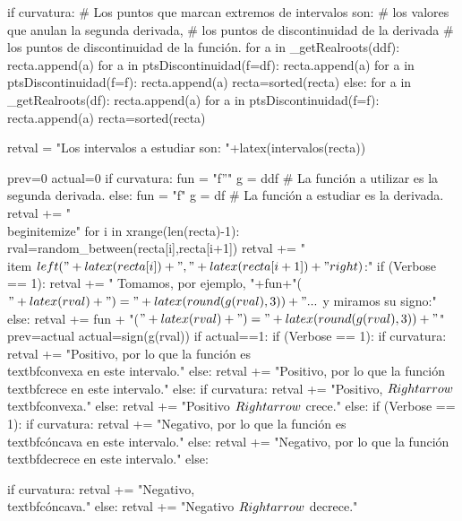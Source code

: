 \begin{sagesilent}
 if curvatura:
    # Los puntos que marcan extremos de intervalos son:
    #       los valores que anulan la segunda derivada, 
    #       los puntos de discontinuidad de la derivada 
    #       los puntos de discontinuidad de la función.
    for a in _getRealroots(ddf):
        recta.append(a)
    for a in ptsDiscontinuidad(f=df):
        recta.append(a)
    for a in ptsDiscontinuidad(f=f):
        recta.append(a)
    recta=sorted(recta) 
 else:
    for a in _getRealroots(df):
        recta.append(a)
    for a in ptsDiscontinuidad(f=f):
        recta.append(a)
    recta=sorted(recta) 
 
 retval = "Los intervalos a estudiar son: "+latex(intervalos(recta))
 
 prev=0
 actual=0
 if curvatura:
    fun = "f''"
    g = ddf # La función a utilizar es la segunda derivada.
 else:
    fun = "f"
    g = df # La función a estudiar es la derivada.
 retval += "\\begin{itemize}"
 for i in xrange(len(recta)-1):
  rval=random_between(recta[i],recta[i+1])
  retval += "\\item $\\left("+latex(recta[i])+","+latex(recta[i+1])+"\\right)$:"
  if (Verbose == 1):
   retval += " Tomamos, por ejemplo, "+fun+"($"+latex(rval)+") = "+latex(round(g(rval),3))+"...$  y miramos su signo:" 
  else:
   retval += fun + "($"+latex(rval)+") = "+latex(round(g(rval),3)) +"$"
  prev=actual
  actual=sign(g(rval))
  if actual==1: 
   if (Verbose == 1):
    if curvatura:
        retval += "Positivo, por lo que la función es \\textbf{convexa} en este intervalo."
    else:
        retval += "Positivo, por lo que la función \\textbf{crece} en este intervalo."  
   else:
    if curvatura:
        retval += "Positivo, $\\Rightarrow$ \\textbf{convexa}."
    else:  
        retval += "Positivo $\\Rightarrow$ crece."
  else:
   if (Verbose == 1):
    if curvatura:
        retval += "Negativo, por lo que la función es \\textbf{cóncava} en este intervalo."
    else:
        retval += "Negativo, por lo que la función \\textbf{decrece} en este intervalo."
   else:

    if curvatura:
        retval += "Negativo, \\textbf{cóncava}."
    else:
        retval += "Negativo $\\Rightarrow$ decrece."



\end{sagesilent}
